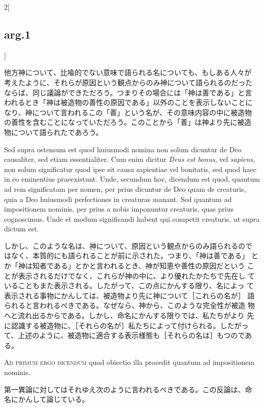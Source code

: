 \documentclass[paper=a4paper,fontsize=10pt,jafontsize=9pt,titlepage]{jlreq}
\begin{document}
\begin{paracol}{2}[\subsection{arg.1}]
\switchcolumn

他方神について、比喩的でない意味で語られる名についても、もしある人々が
考えたように、それらが原因という観点からのみ神について語られるのだった
ならば、同じ議論ができただろう。つまりその場合には「神は善である」と言
われるとき「神は被造物の善性の原因である」以外のことを表示しないことに
なり、神について言われるこの「善」という名が、その意味内容の中に被造物
の善性を含むことになっていただろう。このことから「善」は神より先に被造
物について語られたであろう。

\switchcolumn*

Sed supra ostensum est quod huiusmodi nomina non solum dicuntur de Deo
causaliter, sed etiam essentialiter. Cum enim dicitur {\itshape Deus
est bonus}, vel {\itshape sapiens}, non solum significatur quod ipse
sit causa sapientiae vel bonitatis, sed quod haec in eo eminentius
praeexistunt. Unde, secundum hoc, dicendum est quod, quantum ad rem
significatam per nomen, per prius dicuntur de Deo quam de creaturis,
quia a Deo huiusmodi perfectiones in creaturas manant. Sed quantum ad
impositionem nominis, per prius a nobis imponuntur creaturis, quas
prius cognoscimus. Unde et modum significandi habent qui competit
creaturis, ut supra dictum est.

\switchcolumn

しかし、このような名は、神について、原因という観点からのみ語られるので
はなく、本質的にも語られることが前に示された。つまり、「神は善である」
とか「神は知者である」とかと言われるとき、神が知恵や善性の原因だという
ことが表示されるだけでなく、これらが神の中に、より優れたかたちで先在し
ていることもまた表示される。したがって、この点にかんする限り、名によっ
て表示される事物にかんしては、被造物より先に神について［これらの名が］
語られると言われるべきである。なぜなら、神から、このような完全性が被造
物へと流れ出るからである。しかし、命名にかんする限りでは、私たちがより
先に認識する被造物に、［それらの名が］私たちによって付けられる。したがっ
て、上述のように、被造物に適合する表示様態も［それらの名は］もつのであ
る。

\switchcolumn*[\subsection{ad.1}]

{\scshape Ad primum ergo dicendum} quod obiectio illa procedit quantum
ad impositionem nominis.

\switchcolumn

第一異論に対してはそれゆえ次のように言われるべきである。この反論は、命
名にかんして論じている。


\end{paracol}
\end{document}
